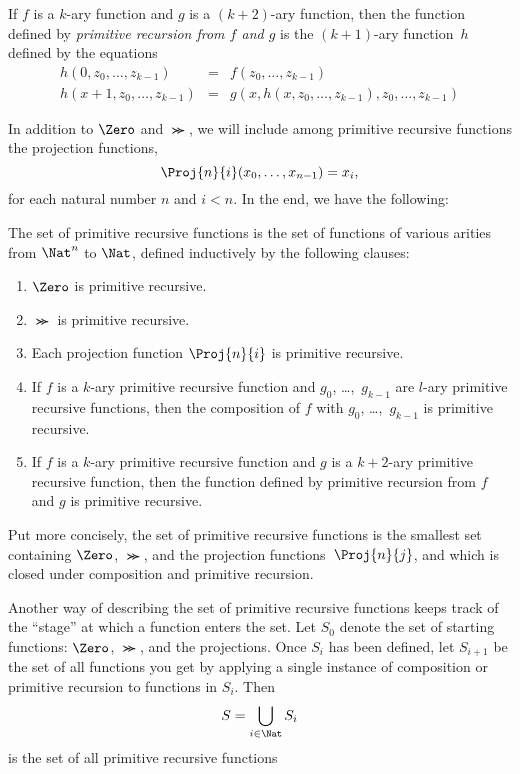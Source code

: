 \documentclass[../../../include/open-logic-section]{subfiles}
\begin{document}
\begin{defn}
If $f$ is a $k$-ary function and
$g$ is a $(k+2)$-ary function, then the function
defined by \emph{primitive recursion from $f$ and $g$} is the
$(k+1)$-ary function~$h$ defined by the equations
\begin{eqnarray*}
h(0,z_0,\dots,z_{k-1}) & = & f(z_0,\dots,z_{k-1}) \\
h(x+1,z_0,\dots,z_{k-1}) & = & g(x,h(x,z_0,\dots,z_{k-1}),z_0,\dots,z_{k-1})
\end{eqnarray*}
\end{defn}

In addition to $\Zero$ and $\Succ$, we will include among primitive
recursive functions the projection functions,
\[
\Proj{n}{i}(x_0,\dots,x_{n-1}) = x_i,
\]
for each natural number $n$ and $i < n$. In the end, we have the
following:

\begin{defn}
  The set of primitive recursive functions is the set of functions of
  various arities from $\Nat^n$ to $\Nat$, defined inductively by the
  following clauses:
\begin{enumerate}
\item $\Zero$ is primitive recursive.
\item $\Succ$ is primitive recursive.
\item Each projection function $\Proj{n}{i}$ is primitive recursive.
\item If $f$ is a $k$-ary primitive recursive function and
  $g_0$, \dots,~$g_{k-1}$ are $l$-ary primitive recursive functions, then
  the composition of $f$ with $g_0$, \dots,~$g_{k-1}$ is primitive
  recursive.
\item If $f$ is a $k$-ary primitive recursive function and $g$ is a
  $k+2$-ary primitive recursive function, then the function defined by
  primitive recursion from $f$ and $g$ is primitive recursive.
\end{enumerate}
\end{defn}

\begin{explain}
Put more concisely, the set of primitive recursive functions is the
smallest set containing $\Zero$, $\Succ$, and the projection
functions~$\Proj{n}{j}$, and which is closed under composition and
primitive recursion.

Another way of describing the set of primitive recursive functions
keeps track of the ``stage'' at which a function enters the set. Let
$S_0$ denote the set of starting functions: $\Zero$, $\Succ$, and the
projections. Once $S_i$ has been defined, let $S_{i+1}$ be the set of
all functions you get by applying a single instance of composition or
primitive recursion to functions in $S_i$. Then
\[
S = \bigcup_{i \in \Nat} S_i
\]
is the set of all primitive recursive functions
\end{explain}
\end{document}

